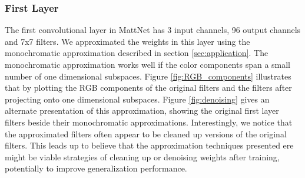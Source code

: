 \vspace{-0.8cm}

\subsubsection{First Layer}

The first convolutional layer in MattNet has 3 input channels, 96
output channels and 7x7 filters.  We approximated the weights in this
layer using the monochromatic approximation described in section
\ref{sec:application}. The monochromatic approximation works well if
the color components span a small number of one dimensional
subspaces. Figure \ref{fig:RGB_components} illustrates that by plotting the RGB components of the original filters and the filters after
projecting onto one dimensional subspaces. Figure \ref{fig:denoising} gives an alternate
presentation of this approximation, showing the original first layer
filters beside their monochromatic approximations.  Interestingly, we
notice that the approximated filters often appear to be cleaned up
versions of the original filters. This leads up to believe that the
approximation techniques presented ere might be viable strategies of
cleaning up or denoising weights after training, potentially to
improve generalization performance.

